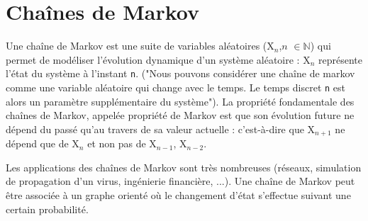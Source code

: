 \section{Chaînes de Markov}

Une chaîne de Markov est une suite de variables aléatoires (X$_n$,$n$ $\in \mathbb{N}$) qui permet de modéliser l'évolution dynamique d’un système aléatoire : X$_n$ représente l’état du système à l’instant \lstinline{n}. ("Nous pouvons considérer une chaîne de markov comme une variable aléatoire qui change avec le temps. Le temps discret \lstinline{n} est alors un paramètre supplémentaire du système"). La propriété fondamentale des chaînes de Markov, appelée propriété de Markov est que son évolution future ne dépend du passé qu'au travers de sa valeur actuelle : c'est-à-dire que X$_{n+1}$ ne dépend que de X$_n$ et non pas de  X$_{n-1}$,  X$_{n-2}$.


Les applications des chaînes de Markov sont très nombreuses (réseaux, simulation de propagation d'un virus, ingénierie financière, ...). Une chaîne de Markov peut être associée à un graphe orienté où le changement d'état s'effectue suivant une certain probabilité. \\

